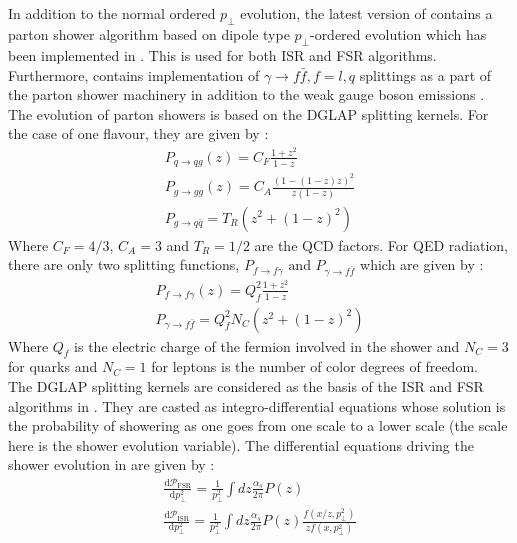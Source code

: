 \subsection{\Pythia}
\label{sec:psunc:tools:pythia}
In addition to the normal ordered $p_\perp$ evolution, the latest version of \Pythia \quad 
contains a parton shower algorithm based on dipole type $p_\perp$-ordered evolution 
which has been implemented in  \cite{Sjostrand:2004ef}. This is used for both 
ISR and FSR algorithms. Furthermore,  \cite{Sjostrand:2007gs,Sjostrand:2014zea}
contains implementation of $\gamma \to f \bar{f}, f=l,q$ splittings as a part of the 
parton shower machinery in addition to the weak gauge boson emissions \cite{Christiansen:2014kba}. \\
The evolution of parton showers is based on the DGLAP splitting kernels. For the case of one flavour, they are
given by :
\begin{eqnarray}
 P_{q \to q g} (z) = C_F \frac{1 + z^2}{1 - z} \\
 P_{g \to g g} (z) = C_A \frac{(1 - (1 - z) z)^2}{z (1-z)} \\
 P_{g \to q \bar{q}} = T_R (z^2 + (1 - z)^2)
\end{eqnarray}
Where $C_F = 4/3$, $C_A = 3$ and $T_R=1/2$ are the QCD factors. For QED radiation, there are only 
two splitting functions, $P_{f\to f \gamma} \text{ and } P_{\gamma \to f\bar{f}}$ which are given by :
\begin{eqnarray}
 P_{f \to f \gamma} (z) = Q_f^2 \frac{1 + z^2}{1 - z} \\
 P_{\gamma \to f \bar{f}} = Q_f^2 N_C (z^2 + (1 - z)^2)
\end{eqnarray}
Where $Q_f$ is the electric charge of the fermion involved in the shower 
and $N_C = 3$ for quarks and $N_C=1$ for leptons is the number of color degrees 
of freedom. \\
The DGLAP splitting kernels are considered as the basis of the ISR and FSR algorithms
in \Pythia. They are casted as integro-differential equations whose solution
is the probability of showering as one goes from one scale to a lower scale (the scale here 
is the shower evolution variable). The differential equations driving the shower evolution 
in \Pythia \quad are given by :
\begin{eqnarray}
 \frac{\text{d} \mathcal{P}_{\text{FSR}}}{\text{d} p_\perp^2} = \frac{1}{p_\perp^2} \int dz \frac{\alpha_s}{2 \pi} P(z) \\
 \frac{\text{d} \mathcal{P}_{\text{ISR}}}{\text{d} p_\perp^2} = \frac{1}{p_\perp^2} \int dz \frac{\alpha_s}{2 \pi} P(z) 
 \frac{f(x/z,p_\perp^2)}{z f(x,p_\perp^2)}
\end{eqnarray}
